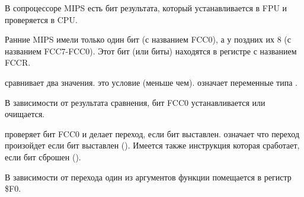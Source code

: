 

В сопроцессоре MIPS есть бит результата, который устанавливается в FPU и проверяется в CPU.

Ранние MIPS имели только один бит (с названием FCC0), а у поздних их 8 (с названием FCC7-FCC0).
Этот бит (или биты) находятся в регистре с названием FCCR.



 сравнивает два значения. 
 это условие  (меньше чем).
 означает переменные типа \Tdouble.

В зависимости от результата сравнения, бит FCC0 устанавливается или очищается.

 проверяет бит FCC0 и делает переход, если бит выставлен.
 означает что переход произойдет если бит выставлен ().
Имеется также инструкция  которая сработает, если бит сброшен ().

В зависимости от перехода один из аргументов функции помещается в регистр \$F0.

